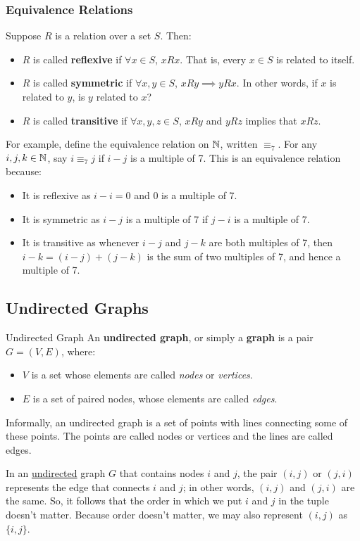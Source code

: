 \documentclass[letterpaper]{article}
\begin{document}
\subsubsection{Equivalence Relations}
Suppose $R$ is a relation over a set $S$. Then:
\begin{itemize}
    \item $R$ is called \textbf{reflexive} if $\forall x \in S$, $x R x$. That is, every $x \in S$ is related to itself. 
    \item $R$ is called \textbf{symmetric} if $\forall x, y \in S$, $x R y \implies y R x$. In other words, if $x$ is related to $y$, is $y$ related to $x$? 
    \item $R$ is called \textbf{transitive} if $\forall x, y, z \in S$, $x R y$ and $y R z$ implies that $x R z$. 
\end{itemize}

For example, define the equivalence relation on $\mathbb{N}$, written $\equiv_7$. For any $i, j, k \in \mathbb{N}$, say $i \equiv_7 j$ if $i - j$ is a multiple of 7. This is an equivalence relation because: 
\begin{itemize}
    \item It is reflexive as $i - i = 0$ and 0 is a multiple of 7. 
    \item It is symmetric as $i - j$ is a multiple of 7 if $j - i$ is a multiple of 7. 
    \item It is transitive as whenever $i - j$ and $j - k$ are both multiples of 7, then $i - k = (i - j) + (j - k)$ is the sum of two multiples of 7, and hence a multiple of 7.  
\end{itemize}


\subsection{Undirected Graphs}
\begin{definition}{Undirected Graph}{}
    An \textbf{undirected graph}, or simply a \textbf{graph} is a pair $G = (V, E)$, where:
    \begin{itemize}
        \item $V$ is a set whose elements are called \emph{nodes} or \emph{vertices}.
        \item $E$ is a set of paired nodes, whose elements are called \emph{edges}.
    \end{itemize} 
    Informally, an undirected graph is a set of points with lines connecting some of these points. The points are called nodes or vertices and the lines are called edges.  
\end{definition}
In an \underline{undirected} graph $G$ that contains nodes $i$ and $j$, the pair $(i, j)$ or $(j, i)$ represents the edge that connects $i$ and $j$; in other words, $(i, j)$ and $(j, i)$ are the same. So, it follows that the order in which we put $i$ and $j$ in the tuple doesn't matter. Because order doesn't matter, we may also represent $(i, j)$ as $\{i, j\}$.
\end{document}
